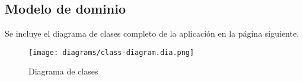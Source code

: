 \subsection{Modelo de dominio}

Se incluye el diagrama de clases completo de la aplicación en la página siguiente.

\clearpage

\begin{sidewaysfigure}
    \texttt{[image: diagrams/class-diagram.dia.png]}
    \caption{Diagrama de clases}
\end{sidewaysfigure}

\clearpage
